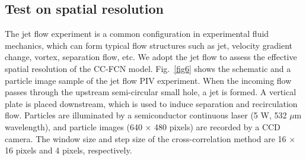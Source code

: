 \documentclass[%
 aip,
 amsmath,amssymb,
 reprint,%
]{revtex4-1}
\begin{document}
\subsection{Test on spatial resolution}
\label{sect4.2}
The jet flow experiment is a common configuration in experimental fluid mechanics, which can form typical flow structures such as jet, velocity gradient change, vortex, separation flow, etc. 
We adopt the jet flow to assess the effective spatial resolution of the CC-FCN model.
Fig.~\ref{fig6} shows the schematic and a particle image sample of the jet flow PIV experiment.
When the incoming flow passes through the upstream semi-circular small hole, a jet is formed. A vertical plate is placed downstream, which is used to induce separation and recirculation flow.
Particles are illuminated by a semiconductor continuous laser (5 W, 532 $\mu$m wavelength), and particle images (640 $\times$ 480 pixels) are recorded by a CCD camera.
The window size and step size of the cross-correlation method are 16 $\times$ 16 pixels and 4 pixels, respectively.
\end{document}
